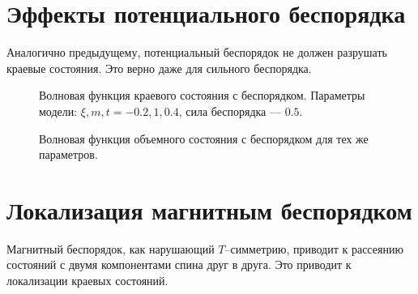 \documentclass{article}
\begin{document}
    \section{Эффекты потенциального беспорядка}
    Аналогично предыдущему, потенциальный беспорядок не должен разрушать краевые состояния.
    Это верно даже для сильного беспорядка.
    \begin{figure}[h]
        \centering
        \begin{minipage}[h]{0.4\linewidth}
            \caption{
                Волновая функция краевого состояния с беспорядком.
                Параметры модели: $\xi, m, t = -0.2, 1, 0.4$, сила беспорядка --- $0.5$.
                }
        \end{minipage}
        \hfill
        \begin{minipage}[h]{0.4\linewidth}
            \caption{
                Волновая функция объемного состояния с беспорядком для тех же параметров.
                }
        \end{minipage}
    \end{figure}
    \section{Локализация магнитным беспорядком}
    Магнитный беспорядок, как нарушающий $T$--симметрию, приводит к рассеянию состояний
    с двумя компонентами спина друг в друга. Это приводит к локализации краевых состояний.
\end{document}
